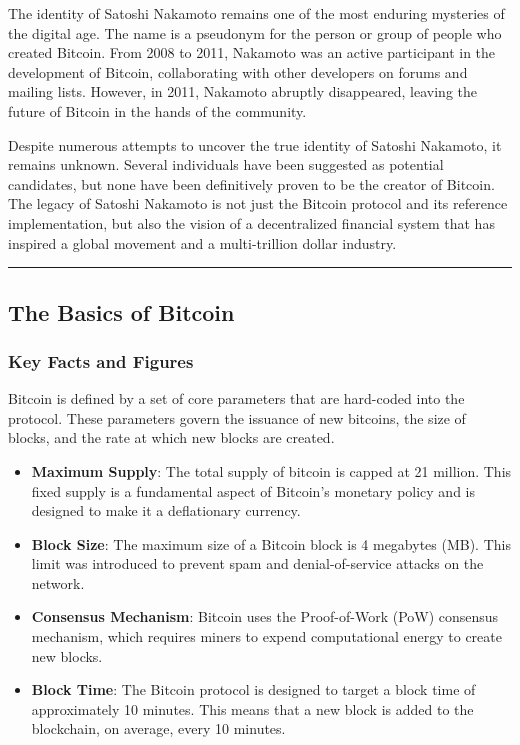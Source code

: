 The identity of Satoshi Nakamoto remains one of the most enduring
mysteries of the digital age. The name is a pseudonym for the person or
group of people who created Bitcoin. From 2008 to 2011, Nakamoto was an
active participant in the development of Bitcoin, collaborating with
other developers on forums and mailing lists. However, in 2011, Nakamoto
abruptly disappeared, leaving the future of Bitcoin in the hands of the
community.

Despite numerous attempts to uncover the true identity of Satoshi
Nakamoto, it remains unknown. Several individuals have been suggested as
potential candidates, but none have been definitively proven to be the
creator of Bitcoin. The legacy of Satoshi Nakamoto is not just the
Bitcoin protocol and its reference implementation, but also the vision
of a decentralized financial system that has inspired a global movement
and a multi-trillion dollar industry.

\begin{center}\rule{0.5\linewidth}{0.5pt}\end{center}

\subsection{The Basics of Bitcoin}\label{section-2-bitcoin-101-the-basics}

\subsubsection{Key Facts and Figures}\label{key-facts-and-figures}

Bitcoin is defined by a set of core parameters that are hard-coded into
the protocol. These parameters govern the issuance of new bitcoins, the
size of blocks, and the rate at which new blocks are created.

\begin{itemize}
	\tightlist
	\item
	\textbf{Maximum Supply}: The total supply of bitcoin is capped at 21
	million. This fixed supply is a fundamental aspect of Bitcoin's
	monetary policy and is designed to make it a deflationary currency.
	\item
	\textbf{Block Size}: The maximum size of a Bitcoin block is 4
	megabytes (MB). This limit was introduced to prevent spam and
	denial-of-service attacks on the network.
	\item
	\textbf{Consensus Mechanism}: Bitcoin uses the Proof-of-Work (PoW)
	consensus mechanism, which requires miners to expend computational
	energy to create new blocks.
	\item
	\textbf{Block Time}: The Bitcoin protocol is designed to target a
	block time of approximately 10 minutes. This means that a new block is
	added to the blockchain, on average, every 10 minutes.
\end{itemize}

